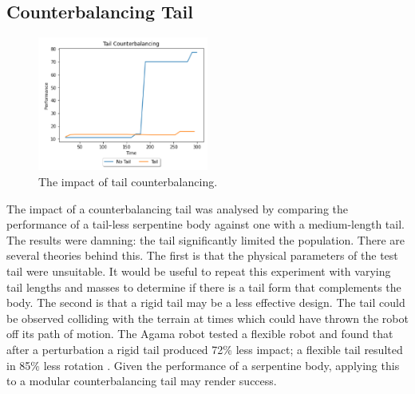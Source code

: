 \documentclass{article}
\begin{document}
\subsection{Counterbalancing Tail}
\label{sec:Tail Res}
\begin{figure}
    \centering
    \includegraphics[width=0.5\textwidth]{tailResults}
    \caption{The impact of tail counterbalancing.}
\end{figure}
The impact of a counterbalancing tail was analysed by comparing the performance of a tail-less serpentine body against one with a medium-length tail. The results were damning: the tail significantly limited the population. There are several theories behind this.
The first is that the physical parameters of the test tail were unsuitable. It would be useful to repeat this experiment with varying tail lengths and masses to determine if there is a tail form that complements the body. 
The second is that a rigid tail may be a less effective design. The tail could be observed colliding with the terrain at times which could have thrown the robot off its path of motion. The Agama robot tested a flexible robot and found that after a perturbation a rigid tail produced 72\% less impact; a flexible tail resulted in 85\% less rotation . Given the performance of a serpentine body, applying this to a modular counterbalancing tail may render success. 

\newpage
\end{document}
